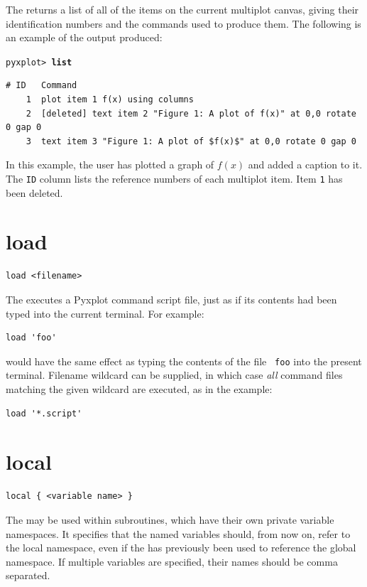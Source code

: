 The  returns a list of all of the items on the current multiplot
canvas, giving their identification numbers and the commands used to produce
them.  The following is an example of the output produced:

{\footnotesize
\texttt{pyxplot> \textbf{list}}
\begin{verbatim}
# ID   Command
    1  plot item 1 f(x) using columns
    2  [deleted] text item 2 "Figure 1: A plot of f(x)" at 0,0 rotate 0 gap 0
    3  text item 3 "Figure 1: A plot of $f(x)$" at 0,0 rotate 0 gap 0
\end{verbatim}
}

In this example, the user has plotted a graph of $f(x)$ and added a caption to
it. The {\tt ID} column lists the reference numbers of each multiplot item.
Item {\tt 1} has been deleted.


\section{load}

\begin{verbatim}
load <filename>
\end{verbatim}

The  executes a Pyxplot command script file, just as if its
contents had been typed into the current terminal. For example:

\begin{verbatim}
load 'foo'
\end{verbatim}

\noindent would have the same effect as typing the contents of the file {\tt
foo} into the present terminal.  Filename wildcard can be supplied, in which
case {\it all} command files matching the given wildcard are executed, as in
the example:

\begin{verbatim}
load '*.script'
\end{verbatim}


\section{local}

\begin{verbatim}
local { <variable name> }
\end{verbatim}

The  may be used within subroutines, which have their
own private variable namespaces. It specifies that the named variables should,
from now on, refer to the local namespace, even if the 
has previously been used to reference the global namespace. If multiple
variables are specified, their names should be comma separated.


